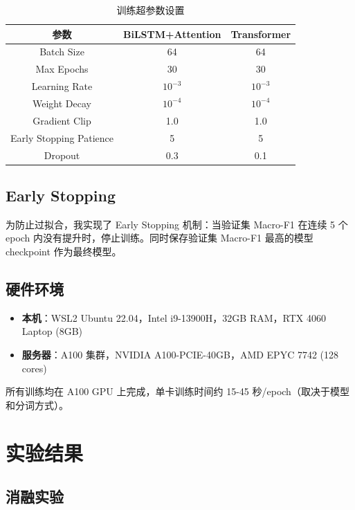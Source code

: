 \documentclass[a4paper]{article}
\begin{document}
\begin{table}[H]
    \centering
    \small
    \begin{tabular}{|c|c|c|}
        \hline
        \textbf{参数} & \textbf{BiLSTM+Attention} & \textbf{Transformer} \\
        \hline
        Batch Size & 64 & 64 \\
        Max Epochs & 30 & 30 \\
        Learning Rate & $10^{-3}$ & $10^{-3}$ \\
        Weight Decay & $10^{-4}$ & $10^{-4}$ \\
        Gradient Clip & 1.0 & 1.0 \\
        Early Stopping Patience & 5 & 5 \\
        Dropout & 0.3 & 0.1 \\
        \hline
    \end{tabular}
    \caption{训练超参数设置}
    \label{tab:train_hyper}
\end{table}

\subsection{Early Stopping}

为防止过拟合，我实现了 Early Stopping 机制：当验证集 Macro-F1 在连续 5 个 epoch 内没有提升时，停止训练。同时保存验证集 Macro-F1 最高的模型 checkpoint 作为最终模型。

\subsection{硬件环境}

\begin{itemize}
    \item \textbf{本机}：WSL2 Ubuntu 22.04，Intel i9-13900H，32GB RAM，RTX 4060 Laptop (8GB)
    \item \textbf{服务器}：A100 集群，NVIDIA A100-PCIE-40GB，AMD EPYC 7742 (128 cores)
\end{itemize}

所有训练均在 A100 GPU 上完成，单卡训练时间约 15-45 秒/epoch（取决于模型和分词方式）。

\section{实验结果}

\subsection{消融实验}
\end{document}

